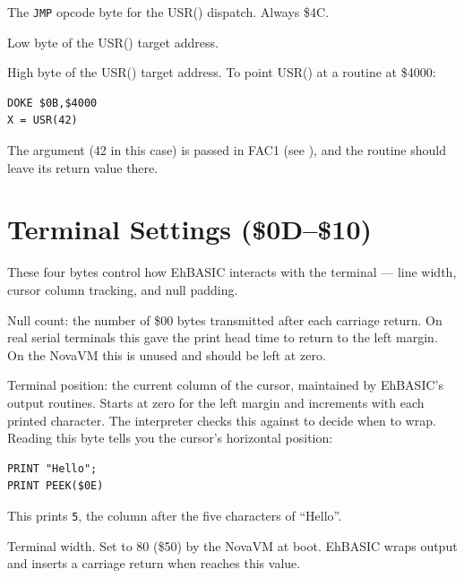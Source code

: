 
The \texttt{JMP} opcode byte for the USR() dispatch.  Always \$4C.


Low byte of the USR() target address.


High byte of the USR() target address.  To point USR() at a routine at
\$4000:

\begin{lstlisting}
DOKE $0B,$4000
X = USR(42)
\end{lstlisting}

The argument (42 in this case) is passed in FAC1 (see ), and the
routine should leave its return value there.

\section{Terminal Settings (\$0D--\$10)}

These four bytes control how EhBASIC interacts with the terminal --- line
width, cursor column tracking, and null padding.


Null count: the number of \$00 bytes transmitted after each carriage return.
On real serial terminals this gave the print head time to return to the left
margin.  On the NovaVM this is unused and should be left at zero.


Terminal position: the current column of the cursor, maintained by EhBASIC's
output routines.  Starts at zero for the left margin and increments with each
printed character.  The interpreter checks this against  to decide
when to wrap.  Reading this byte tells you the cursor's horizontal position:

\begin{lstlisting}
PRINT "Hello";
PRINT PEEK($0E)
\end{lstlisting}

This prints \texttt{5}, the column after the five characters of ``Hello''.


Terminal width.  Set to 80 (\$50) by the NovaVM at boot.  EhBASIC wraps
output and inserts a carriage return when  reaches this value.

